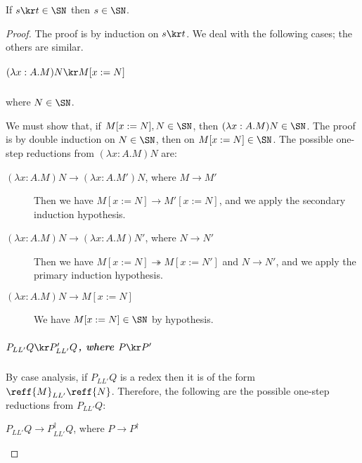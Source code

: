 \begin{lm}
If $s \kr t \in \SN$ then $s \in \SN$.
\end{lm}

\begin{proof}
The proof is by induction on $s \kr t$.  We deal with the following cases; the others are similar.

\subparagraph{$(\lambda x:A.M)N \kr M[x:=N]$} where $N \in \SN$.

We must show that, if $M[x:=N], N \in \SN$, then $(\lambda x:A.M)N \in \SN$.  The proof is by
double induction on $N \in \SN$, then on $M[x:=N] \in \SN$.  The possible one-step reductions from $(\lambda x:A.M)N$ are:

\begin{description}
\item[$(\lambda x:A.M)N \rightarrow (\lambda x:A.M')N$, where $M \rightarrow M'$]  Then we have
$M[x:=N] \rightarrow M'[x:=N]$, and we apply the secondary induction hypothesis.
\item[$(\lambda x:A.M)N \rightarrow (\lambda x:A.M)N'$, where $N \rightarrow N'$]  Then we have $M[x:=N] \twoheadrightarrow M[x:=N']$ and
$N \rightarrow N'$, and we apply the primary induction hypothesis.
\item[$(\lambda x:A.M)N \rightarrow M{[x:=N]}$]  We have $M[x:=N] \in \SN$ by hypothesis.
\end{description}

\subparagraph{$P_{L L'} Q \kr P'_{L L'} Q$, where $P \kr P'$}  By case analysis, if $P_{L L'} Q$ is a redex then it is of the form $\reff{M}_{L L'} \reff{N}$.
Therefore, the following are the possible one-step reductions from $P_{L L'} Q$:

\begin{description}
\item{$P_{L L'} Q \rightarrow P^\dagger_{L L'} Q$, where $P \rightarrow P^\dagger$}  
\end{description}
\end{proof}